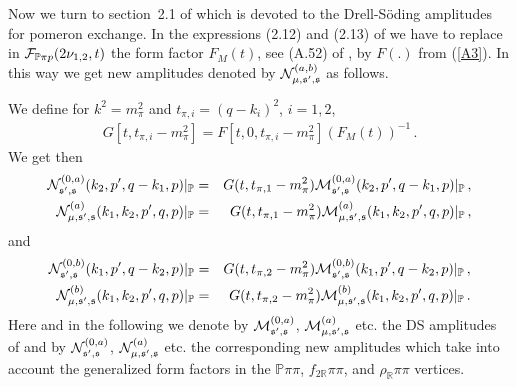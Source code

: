 \documentclass[a4paper,11pt]{article}
\newcommand{\Pom}{\mathbb{P}}
\newcommand{\Reg}{\mathbb{R}}
\begin{document}
Now we turn to section~2.1 of \cite{Lebiedowicz:2025xob}
which is devoted to the Drell-S{\"o}ding amplitudes for pomeron exchange.
In the expressions (2.12) and (2.13) of \cite{Lebiedowicz:2025xob}
we have to replace in ${\cal F}_{\Pom \pi p}(2 \nu_{1,2}, t)$
the form factor $F_{M}(t)$,
see (A.52) of \cite{Lebiedowicz:2025xob}, by $F(.)$ from (\ref{A3}).
In this way we get new amplitudes
denoted by ${\cal N}^{(a,b)}_{\mu, \mathfrak{s'},\mathfrak{s}}$ as follows.

We define for $k^{2} = m_{\pi}^{2}$ and 
$t_{\pi,i} = (q - k_{i})^{2}$, $i = 1,2$,
%
\begin{eqnarray}
G[t, t_{\pi,i} - m_{\pi}^{2}] = 
F[t, 0, t_{\pi,i} - m_{\pi}^{2}] (F_{M}(t))^{-1}\,.
\label{A6}
\end{eqnarray}
%
We get then
%
\begin{eqnarray}
{\cal N}^{(0,a)}_{\mathfrak{s'},\mathfrak{s}}(k_{2},p',q-k_{1},p)|_{\Pom}&=&
G(t,t_{\pi,1}-m_{\pi}^{2})
{\cal M}^{(0,a)}_{\mathfrak{s'},\mathfrak{s}}(k_{2},p',q-k_{1},p)|_{\Pom}\,,\label{A8}\\
{\cal N}^{(a)}_{\mu, \mathfrak{s'},\mathfrak{s}}(k_{1},k_{2},p',q,p)|_{\Pom}&=&
G(t,t_{\pi,1}-m_{\pi}^{2})
{\cal M}^{(a)}_{\mu, \mathfrak{s'},\mathfrak{s}}(k_{1},k_{2},p',q,p)|_{\Pom}\,, 
\label{A9}
\end{eqnarray}
and
\begin{eqnarray}
{\cal N}^{(0,b)}_{\mathfrak{s'},\mathfrak{s}}(k_{1},p',q-k_{2},p)|_{\Pom}&=&
G(t,t_{\pi,2}-m_{\pi}^{2})
{\cal M}^{(0,b)}_{\mathfrak{s'},\mathfrak{s}}(k_{1},p',q-k_{2},p)|_{\Pom}\,,
\label{A10}\\
{\cal N}^{(b)}_{\mu, \mathfrak{s'},\mathfrak{s}}(k_{1},k_{2},p',q,p)|_{\Pom} &=&
G(t,t_{\pi,2}-m_{\pi}^{2})
{\cal M}^{(b)}_{\mu, \mathfrak{s'},\mathfrak{s}}(k_{1},k_{2},p',q,p)|_{\Pom}\,. 
\label{A11}
\end{eqnarray}
%
Here and in the following we denote by ${\cal M}^{(0,a)}_{\mathfrak{s'},\mathfrak{s}}$,
${\cal M}^{(a)}_{\mu,\mathfrak{s'},\mathfrak{s}}$ etc. 
the DS amplitudes of \cite{Lebiedowicz:2025xob}
and by ${\cal N}^{(0,a)}_{\mathfrak{s'},\mathfrak{s}}$,
${\cal N}^{(a)}_{\mu,\mathfrak{s'},\mathfrak{s}}$ etc.
the corresponding new amplitudes which take into account the generalized form factors 
in the $\Pom \pi \pi$, $f_{2 \Reg} \pi \pi$, 
and $\rho_{\Reg} \pi \pi$ vertices.
\end{document}

